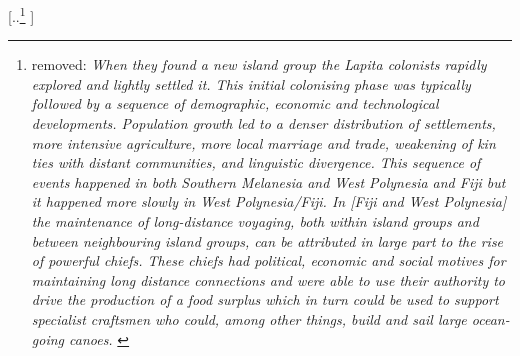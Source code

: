 \documentclass[unnumsec,webpdf,modern,medium]{oup-authoring-template}
\providecommand{\DIFdeltex}[1]{{\protect\color{red} [..\footnote{removed: #1} ]}} %
\providecommand{\DIFdelbegin}{} %
\providecommand{\DIFdelend}{} %
\providecommand{\DIFdel}[1]{\texorpdfstring{\DIFdeltex{#1}}{}} %
\newcommand{\DIFscaledelfig}{0.5}
\newlength{\DIFdelgraphicswidth} %
\newlength{\DIFdelgraphicsheight} %
\newcommand{\DIFdelincludegraphics}[2][]{%
\sbox{\DIFdelgraphicsbox}{\DIFOincludegraphics[#1]{#2}}%
\settoboxwidth{\DIFdelgraphicswidth}{\DIFdelgraphicsbox} %
\settoboxtotalheight{\DIFdelgraphicsheight}{\DIFdelgraphicsbox} %
\scalebox{\DIFscaledelfig}{%
\parbox[b]{\DIFdelgraphicswidth}{\usebox{\DIFdelgraphicsbox}\\[-\baselineskip] \rule{\DIFdelgraphicswidth}{0em}}\llap{\resizebox{\DIFdelgraphicswidth}{\DIFdelgraphicsheight}{%
\setlength{\unitlength}{\DIFdelgraphicswidth}%
\begin{picture}(1,1)%
\thicklines\linethickness{2pt} %
{\color[rgb]{1,0,0}\put(0,0){\framebox(1,1){}}}%
{\color[rgb]{1,0,0}\put(0,0){\line( 1,1){1}}}%
{\color[rgb]{1,0,0}\put(0,1){\line(1,-1){1}}}%
\end{picture}%
}\hspace*{3pt}}} %
} %
\DeclareRobustCommand{\DIFdelbegin}{\DIFOdelbegin \let\includegraphics\DIFdelincludegraphics} %
\DeclareRobustCommand{\DIFdelend}{\DIFOaddend \let\includegraphics\DIFOincludegraphics} %
\begin{document}
\DIFdelbegin %
\DIFdel{\emph{When they found a new island group the Lapita colonists rapidly explored and lightly settled it. This initial colonising phase was typically followed by a sequence of demographic, economic and technological developments. Population growth led to a denser distribution of settlements, more intensive agriculture, more local marriage and trade, weakening of kin ties with distant communities, and linguistic divergence. This sequence of events happened in both Southern Melanesia and West Polynesia and Fiji but it happened more slowly in West Polynesia/Fiji. In [Fiji and West Polynesia] the maintenance of long-distance voyaging, both within island groups and between neighbouring island groups, can be attributed in large part to the rise of powerful chiefs. These chiefs had political, economic and social motives for maintaining long distance connections and were able to use their authority to drive the production of a food surplus which in turn could be used to support specialist craftsmen who could, among other things, build and sail large ocean-going canoes.} \citep[28]{pawley2007} }%
\DIFdelend %
\end{document}
